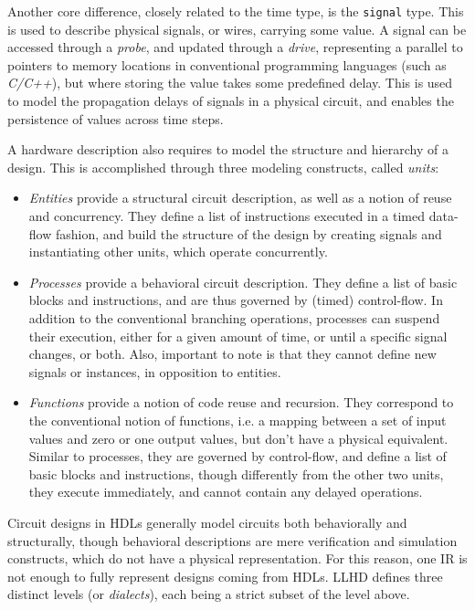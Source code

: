 Another core difference, closely related to the time type, is the \texttt{signal} type. This is used to describe physical signals, or wires, carrying some value. A signal can be accessed through a \textit{probe}, and updated through a \textit{drive}, representing a parallel to pointers to memory locations in conventional programming languages (such as \textit{C/C++}), but where storing the value takes some predefined delay. This is used to model the propagation delays of signals in a physical circuit, and enables the persistence of values across time steps.

A hardware description also requires to model the structure and hierarchy of a design. This is accomplished through three modeling constructs, called \textit{units}:
\begin{itemize}
    \item \textit{Entities} provide a structural circuit description, as well as a notion of reuse and concurrency. They define a list of instructions executed in a timed data-flow fashion, and build the structure of the design by creating signals and instantiating other units, which operate concurrently.
    \item \textit{Processes} provide a behavioral circuit description. They define a list of basic blocks and instructions, and are thus governed by (timed) control-flow. In addition to the conventional branching operations, processes can suspend their execution, either for a given amount of time, or until a specific signal changes, or both. Also, important to note is that they cannot define new signals or instances, in opposition to entities.
    \item \textit{Functions} provide a notion of code reuse and recursion. They correspond to the conventional notion of functions, i.e. a mapping between a set of input values and zero or one output values, but don’t have a physical equivalent. Similar to processes, they are governed by control-flow, and define a list of basic blocks and instructions, though differently from the other two units, they execute immediately, and cannot contain any delayed operations.
\end{itemize}


Circuit designs in HDLs generally model circuits both behaviorally and structurally, though behavioral descriptions are mere verification and simulation constructs, which do not have a physical representation. For this reason, one IR is not enough to fully represent designs coming from HDLs. LLHD defines three distinct levels (or \textit{dialects}), each being a strict subset of the level above.

